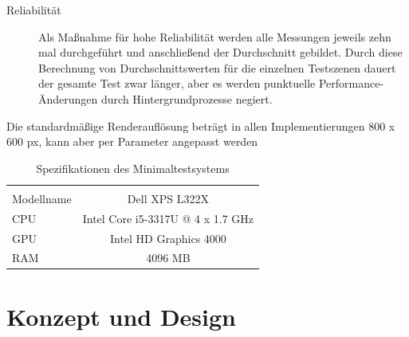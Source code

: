 \begin{description}
\item[Reliabilität] Als Maßnahme für hohe Reliabilität werden alle Messungen jeweils zehn mal durchgeführt und anschließend der Durchschnitt gebildet. Durch diese Berechnung von Durchschnittswerten für die einzelnen Testszenen dauert der gesamte Test zwar länger, aber es werden punktuelle Performance-Änderungen durch Hintergrundprozesse negiert. \\
\end{description}
Die standardmäßige Renderauflösung beträgt in allen Implementierungen 800 x 600 px, kann aber per Parameter angepasst werden

\begin{table}
    \begin{tabular}{ | l | c |}
    \hline \\
    Modellname & Dell XPS L322X \\ \hline
    CPU & Intel Core i5-3317U @ 4 x 1.7 GHz \\ \hline
    GPU & Intel HD Graphics 4000 \\ \hline
    RAM & 4096 MB \\ \hline
    \end{tabular}
    \caption{Spezifikationen des Minimaltestsystems}
   	\label{tab:specs}
\end{table}

\chapter{Konzept und Design}

